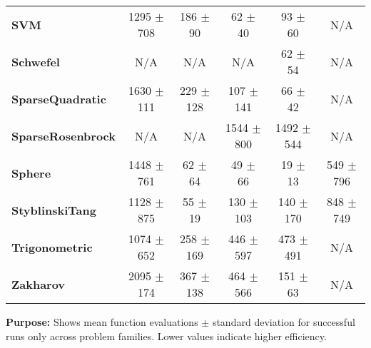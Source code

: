 \begin{table}[htbp]
{\begin{tabular}{lccccc}
\textbf{SVM} & 1295 $\pm$ 708 & 186 $\pm$ 90 & 62 $\pm$ 40 & 93 $\pm$ 60 & N/A \\
\textbf{Schwefel} & N/A & N/A & N/A & 62 $\pm$ 54 & N/A \\
\textbf{SparseQuadratic} & 1630 $\pm$ 111 & 229 $\pm$ 128 & 107 $\pm$ 141 & 66 $\pm$ 42 & N/A \\
\textbf{SparseRosenbrock} & N/A & N/A & 1544 $\pm$ 800 & 1492 $\pm$ 544 & N/A \\
\textbf{Sphere} & 1448 $\pm$ 761 & 62 $\pm$ 64 & 49 $\pm$ 66 & 19 $\pm$ 13 & 549 $\pm$ 796 \\
\textbf{StyblinskiTang} & 1128 $\pm$ 875 & 55 $\pm$ 19 & 130 $\pm$ 103 & 140 $\pm$ 170 & 848 $\pm$ 749 \\
\textbf{Trigonometric} & 1074 $\pm$ 652 & 258 $\pm$ 169 & 446 $\pm$ 597 & 473 $\pm$ 491 & N/A \\
\textbf{Zakharov} & 2095 $\pm$ 174 & 367 $\pm$ 138 & 464 $\pm$ 566 & 151 $\pm$ 63 & N/A \\
\bottomrule
\end{tabular}
}
\end{table}
\textbf{Purpose:} Shows mean function evaluations $\pm$ standard deviation for successful runs only across problem families. Lower values indicate higher efficiency.
